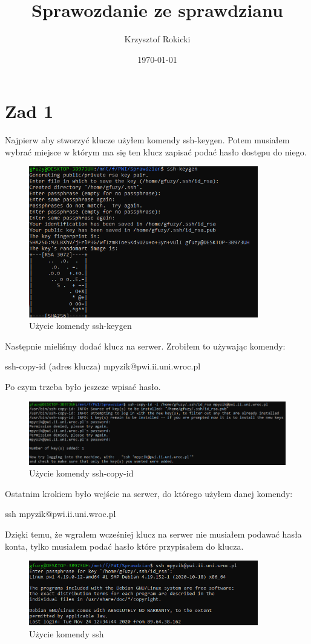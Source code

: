 \documentclass[a4paper,12pt]{article}
\author{Krzysztof Rokicki}
\title{Sprawozdanie ze sprawdzianu}
\date{\today}
\begin{document}
\maketitle
\section{Zad 1}
Najpierw aby stworzyć klucze użyłem komendy ssh-keygen. Potem musiałem wybrać miejsce w którym ma się ten klucz zapisać  podać hasło dostępu do niego.\\
\begin{figure}
\centering
\includegraphics[width=10cm]{ssh-keygen}
\caption{Użycie komendy ssh-keygen}
\end{figure}
Następnie mieliśmy dodać klucz na serwer. Zrobiłem to używając komendy:
\begin{center}
 ssh-copy-id (adres klucza) mpyzik@pwi.ii.uni.wroc.pl
\end{center}
Po czym trzeba było jeszcze wpisać hasło.
\begin{figure}
\centering
\includegraphics[width=15cm]{ssh-copy-id}
\caption{Użycie komendy ssh-copy-id}
\end{figure}
Ostatnim krokiem było wejście na serwer, do którego użyłem danej komendy:
\begin{center}
 ssh mpyzik@pwi.ii.uni.wroc.pl
\end{center}
Dzięki temu, że wgrałem wcześniej klucz na serwer nie musiałem podawać hasła konta, tylko musiałem podać hasło które przypisałem do klucza.
\begin{figure}
\centering
\includegraphics[width=10cm]{ssh}
\caption{Użycie komendy ssh}
\end{figure}
\end{document}
